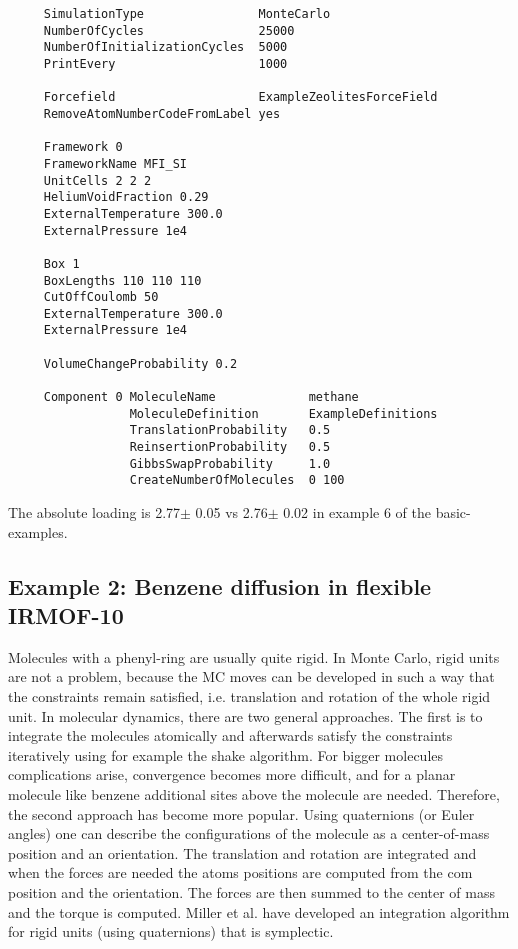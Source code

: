 \begin{tiny}
\begin{verbatim}
     SimulationType                MonteCarlo
     NumberOfCycles                25000
     NumberOfInitializationCycles  5000
     PrintEvery                    1000

     Forcefield                    ExampleZeolitesForceField
     RemoveAtomNumberCodeFromLabel yes

     Framework 0
     FrameworkName MFI_SI
     UnitCells 2 2 2
     HeliumVoidFraction 0.29
     ExternalTemperature 300.0
     ExternalPressure 1e4

     Box 1
     BoxLengths 110 110 110
     CutOffCoulomb 50
     ExternalTemperature 300.0
     ExternalPressure 1e4

     VolumeChangeProbability 0.2

     Component 0 MoleculeName             methane
                 MoleculeDefinition       ExampleDefinitions
                 TranslationProbability   0.5
                 ReinsertionProbability   0.5
                 GibbsSwapProbability     1.0
                 CreateNumberOfMolecules  0 100
\end{verbatim}
\end{tiny}

The absolute loading is 2.77$\pm$ 0.05 vs 2.76$\pm$ 0.02 in example 6 of the basic-examples.

\subsection*{Example 2: Benzene diffusion in flexible IRMOF-10}

Molecules with a phenyl-ring are usually quite rigid. In Monte Carlo, rigid units are not a problem, because the MC moves can be developed in such a way that the
constraints remain satisfied, i.e. translation and rotation of the whole rigid unit. In molecular dynamics, there are two general approaches. The first is to integrate
the molecules atomically and afterwards satisfy the constraints iteratively using for example the shake algorithm. For bigger molecules complications arise, convergence
becomes more difficult, and for a planar molecule like benzene additional sites above the molecule are needed. Therefore, the second approach has become more popular.
Using quaternions (or Euler angles) one can describe the configurations of the molecule as a center-of-mass position and an orientation. The translation and rotation
are integrated and when the forces are needed the atoms positions are computed from the com position and the orientation. The forces are then summed to the center of mass
and the torque is computed. Miller et al. have developed an integration algorithm for rigid units (using quaternions) that is symplectic\cite{Miller2002}.

